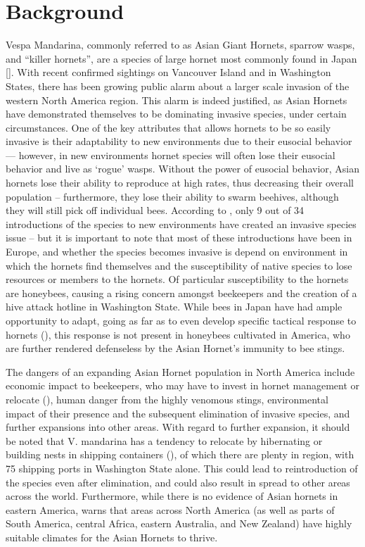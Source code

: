 \documentclass[letterpaper]{article}
\begin{document}
\section{Background}
Vespa Mandarina, commonly referred to as Asian Giant Hornets, sparrow wasps, and “killer hornets”, are a species of large hornet most commonly found in Japan [\cite{penn}]. With recent confirmed sightings on Vancouver Island and in Washington States, there has been growing public alarm about a larger scale invasion of the western North America region. This alarm is indeed justified, as Asian Hornets have demonstrated themselves to be dominating invasive species, under certain circumstances. One of the key attributes that allows hornets to be so easily invasive is their adaptability to new environments due to their eusocial behavior –– however, in new environments hornet species will often lose their eusocial behavior and live as ‘rogue’ wasps. Without the power of eusocial behavior, Asian hornets lose their ability to reproduce at high rates, thus decreasing their overall population – furthermore, they lose their ability to swarm beehives, although they will still pick off individual bees. According to \cite{french}, only 9 out of 34 introductions of the species to new environments have created an invasive species issue – but it is important to note that most of these introductions have been in Europe, and whether the species becomes invasive is depend on environment in which the hornets find themselves and the susceptibility of native species to lose resources or members to the hornets. Of particular susceptibility to the hornets are honeybees, causing a rising concern amongst beekeepers and the creation of a hive attack hotline in Washington State. While bees in Japan have had ample opportunity to adapt, going as far as to even develop specific tactical response to hornets (\cite{french}), this response is not present in honeybees cultivated in America, who are further rendered defenseless by the Asian Hornet’s immunity to bee stings. 

The dangers of an expanding Asian Hornet population in North America include economic impact to beekeepers, who may have to invest in hornet management or relocate (\cite{niche}), human danger from the highly venomous stings, environmental impact of their presence and the subsequent elimination of invasive species, and further expansions into other areas. With regard to further expansion, it should be noted that V. mandarina has a tendency to relocate by hibernating or building nests in shipping containers (\cite{niche}), of which there are plenty in region, with 75 shipping ports in Washington State alone. This could lead to reintroduction of the species even after elimination, and could also result in spread to other areas across the world. Furthermore, while there is no evidence of Asian hornets in eastern America, \cite{niche} warns that areas across North America (as well as parts of South America, central Africa, eastern Australia, and New Zealand) have highly suitable climates for the Asian Hornets to thrive.
\end{document}
